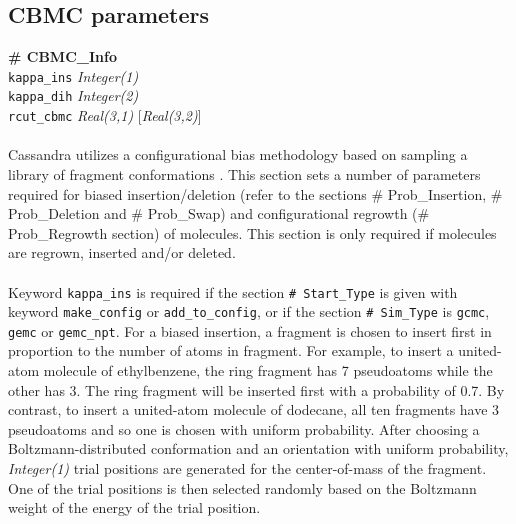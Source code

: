 \subsection{CBMC parameters}\label{sec:CBMC_Info}
{\bf \# CBMC\_Info} \\
{\tt kappa\_ins} {\it Integer(1)} \\
{\tt kappa\_dih} {\it Integer(2)} \\
{\tt rcut\_cbmc} {\it Real(3,1)} [{\it Real(3,2)}] \\ \\
%
Cassandra utilizes a configurational bias methodology based on sampling a library of fragment conformations \cite{Shah:2011}.
This section sets a number of parameters required for biased insertion/deletion (refer to the sections
\# Prob\_Insertion, \# Prob\_Deletion and \# Prob\_Swap) and configurational
regrowth (\# Prob\_Regrowth section) of molecules. 
This section is only required if molecules are regrown, inserted and/or deleted. \\ \\
%
Keyword {\tt kappa\_ins} is required
if the section {\tt \# Start\_Type} is given with keyword {\tt make\_config} or {\tt add\_to\_config}, or
if the section {\tt \# Sim\_Type} is {\tt gcmc}, {\tt gemc} or {\tt gemc\_npt}.
For a biased insertion, a fragment is chosen to insert first in proportion to the number of atoms in fragment.
For example, to insert a united-atom molecule of ethylbenzene, 
the ring fragment has 7 pseudoatoms while the other has 3.
The ring fragment will be inserted first with a probability of 0.7.
By contrast, to insert a united-atom molecule of dodecane, 
all ten fragments have 3 pseudoatoms and so one is chosen with uniform probability.
After choosing a Boltzmann-distributed conformation and an orientation with uniform probability,
{\it Integer(1)} trial positions are generated for the center-of-mass of the fragment.
One of the trial positions is then selected randomly based on the Boltzmann weight of the energy of the trial position. \\ \\
%
